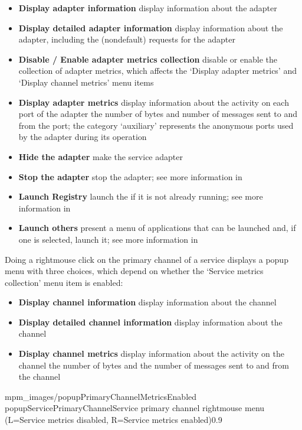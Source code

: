 \begin{itemize}
\item\textbf{Display adapter information} display information about the adapter
\item\exSp\textbf{Display detailed adapter information} display information about the
adapter, including the (non\longDash{}default) requests for the adapter
\item\exSp\textbf{Disable / Enable adapter metrics collection} disable or enable the
collection of adapter metrics, which affects the `Display adapter metrics' and `Display
channel metrics' menu items
\item\exSp\textbf{Display adapter metrics} display information about the activity on each
port of the adapter \longDash{} the number of bytes and number of messages sent to and
from the port; the category `auxiliary' represents the anonymous ports used by the adapter
during its operation
\item\exSp\textbf{Hide the adapter} make the service adapter
\item\exSp\textbf{Stop the adapter} stop the adapter; see more information in
\item\exSp\textbf{Launch Registry} launch the \emph{\RS} if it is not already running; see
more information in\\
\item\exSp\textbf{Launch others \textellipsis} present a menu of applications that can be
launched and, if one is selected, launch it; see more information in
\end{itemize}
\condPage{}
Doing a right\longDash{}mouse click on the primary channel of a service displays a popup
menu with three choices, which depend on whether the `Service metrics collection' menu
item is enabled:
\begin{itemize}
\item\textbf{Display channel information} display information about the channel
\item\exSp\textbf{Display detailed channel information} display information about the
channel
\item\exSp\textbf{Display channel metrics} display information about the activity on the
channel \longDash{} the number of bytes and the number of messages sent to and from the
channel
\end{itemize}
%
{mpm_images/popupPrimaryChannelMetricsEnabled}%
{popupServicePrimaryChannel}{Service primary channel right\longDash{}mouse menu 
(L=Service metrics disabled, R=Service metrics enabled)}{0.9}

